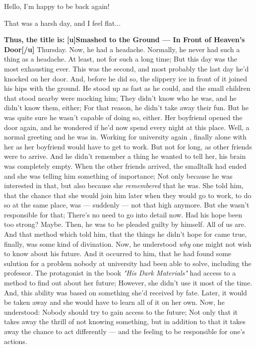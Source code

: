 Hello, I'm happy to be back again!

That was a harsh day, and I feel flat...

\textbf{Thus, the title is:}
\textbf{[u]Smashed to the Ground --- In Front of Heaven's Door[/u]}
Thursday. 
Now, he had a headache. 
Normally, he never had such a thing as a headache. 
At least, not for such a long time; But this day was the most exhausting ever. 
This was the second, and most probably the last day he'd knocked on her door. 
And, before he did so, the slippery ice in front of it joined his hips with the ground. 
He stood up as fast as he could, and the small children that stood nearby were mocking him; They didn't know who he was, and he didn't know them, either; For that reason, he didn't take away their fun. 
But he was quite sure he wasn't capable of doing so, either. 
Her boyfriend opened the door again, and he wondered if he'd now spend every night at this place. 
Well, a normal greeting and he was in. 
Working for university again , finally alone with her as her boyfriend would have to get to work. 
But not for long, as other friends were to arrive. And he didn't remember a thing he wanted to tell her, his brain was completely empty. 
When the other friends arrived, the smalltalk had ended and she was telling him something of importance; Not only because he was interested in that, but also because she \emph{remembered} that he was. 
She told him, that the chance that she would join him later when they would go to work, to do so at the same place, was --- suddenly --- not that high anymore. 
But she wasn't responsible for that; There's no need to go into detail now. 
Had his hope been too strong?
Maybe. 
Then, he was to be pleaded guilty by himself. 
All of us are. 
And that method which told him, that the things he didn't hope for came true, finally, was some kind of divination. 
Now, he understood \emph{why} one might not wish to know about his future. 
And it occurred to him, that he had found some sulution for a problem nobody at university had been able to solve, including the professor. 
The protagonist in the book \emph{"His Dark Materials"} had access to a method to find out about her future; However, she didn't use it most of the time. 
And, this ability was based on something she'd received by fate. Later, it would be taken away and she would have to learn all of it on her own. 
Now, he understood: Nobody should try to gain access to the future; Not only that it takes away the thrill of not knowing something, but in addition to that it takes away the chance to act differently --- and the feeling to be responsible for one's actions. 
